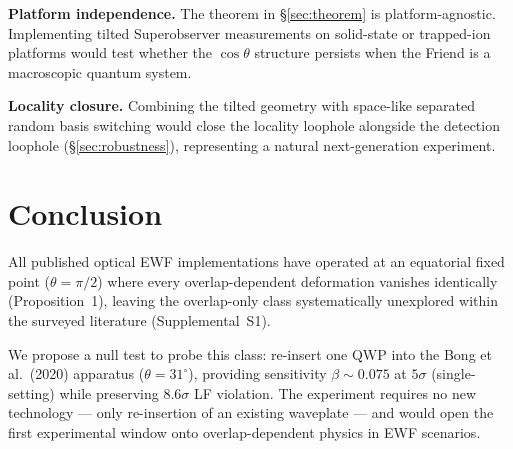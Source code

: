 \documentclass[twocolumn,aps,pra,superscriptaddress,floatfix,10pt]{revtex4-2}
\begin{document}
\textbf{Platform independence.} The theorem in \S\ref{sec:theorem} is platform-agnostic.
Implementing tilted Superobserver measurements on solid-state or
trapped-ion platforms would test whether the $\cos\theta$ structure persists
when the Friend is a macroscopic quantum system.

\textbf{Locality closure.} Combining the tilted geometry with space-like
separated random basis switching would close the locality loophole
alongside the detection loophole (\S\ref{sec:robustness}), representing a natural
next-generation experiment.

\section{Conclusion}
\label{sec:conclusion}

All published optical EWF implementations have operated at an equatorial
fixed point ($\theta = \pi/2$) where every overlap-dependent deformation vanishes
identically (Proposition~1), leaving the overlap-only class systematically
unexplored within the surveyed literature (Supplemental~S1).

We propose a null test to probe this class: re-insert one QWP into the
Bong et al.\ (2020) apparatus ($\theta = 31^\circ$), providing sensitivity $\beta \sim 0.075$
at $5\sigma$ (single-setting) while preserving $8.6\sigma$ LF violation. The
experiment requires no new technology --- only re-insertion of an existing
waveplate --- and would open the first experimental window onto
overlap-dependent physics in EWF scenarios.
\end{document}

